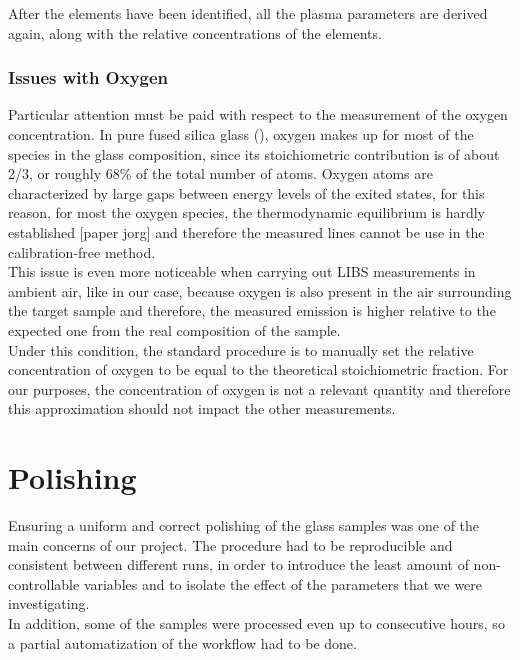 After the elements have been identified, all the plasma parameters are derived again, along with the relative concentrations of the elements. 

\subsubsection{Issues with Oxygen}
\label{subsubsec:oxygen_issues}

Particular attention must be paid with respect to the measurement of the oxygen concentration. In pure fused silica glass (), oxygen makes up for most of the species in the glass composition, since its stoichiometric contribution is of about 2/3, or roughly 68\% of the total number of atoms. Oxygen atoms are characterized by large gaps between energy levels of the exited states, for this reason, for most the oxygen species, the thermodynamic equilibrium is hardly established [paper jorg] and therefore the measured lines cannot be use in the calibration-free method.
\\
This issue is even more noticeable when carrying out LIBS measurements in ambient air, like in our case, because oxygen is also present in the air surrounding the target sample and therefore, the measured emission is higher relative to the expected one from the real composition of the sample. 
\\
Under this condition, the standard procedure is to manually set the relative concentration of oxygen to be equal to the theoretical stoichiometric fraction. For our purposes, the concentration of oxygen is not a relevant quantity and therefore this approximation should not impact the other measurements.













\section{Polishing}
\label{Polishing}
Ensuring a uniform and correct polishing of the glass samples was one of the main concerns of our project. The procedure had to be reproducible and consistent between different runs, in order to introduce the least amount of non-controllable variables and to isolate the effect of the parameters that we were investigating.
\\
In addition, some of the samples were processed even up to consecutive hours, so a partial automatization of the workflow had to be done.
